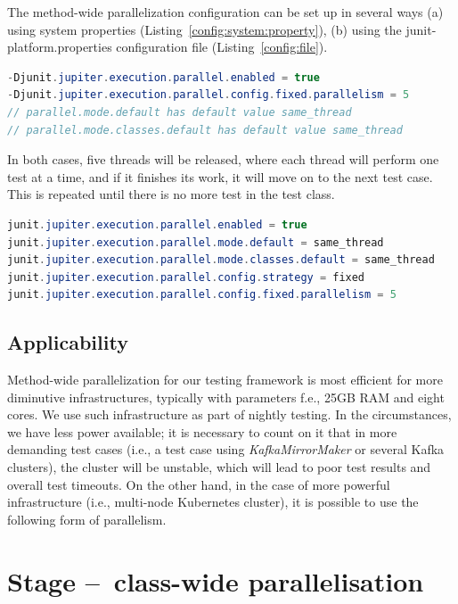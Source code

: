The method-wide parallelization configuration can be set up in several ways (a) using system properties (Listing~\ref{config:system:property}),
(b) using the junit-platform.properties configuration file (Listing~\ref{config:file}).
\begin{lstlisting}[language= Java,label=config:system:property,caption=(a) Configuration via system properties,frame=tb]
-Djunit.jupiter.execution.parallel.enabled = true
-Djunit.jupiter.execution.parallel.config.fixed.parallelism = 5
// parallel.mode.default has default value same_thread
// parallel.mode.classes.default has default value same_thread
\end{lstlisting}
In both cases, five threads will be released, where each thread will perform one test at a time, and if it finishes its work, it will move on to the next test case. This is repeated until there is no more test in the test class.
\begin{lstlisting}[language=Java,label=config:file,caption=(b) Configuration via file,frame = tb]
junit.jupiter.execution.parallel.enabled = true
junit.jupiter.execution.parallel.mode.default = same_thread
junit.jupiter.execution.parallel.mode.classes.default = same_thread
junit.jupiter.execution.parallel.config.strategy = fixed
junit.jupiter.execution.parallel.config.fixed.parallelism = 5
\end{lstlisting}

\subsection{Applicability}
\label{05:sub:sec:applicability}

Method-wide parallelization for our testing framework is most efficient for more diminutive infrastructures,
typically with parameters f.e., 25GB RAM and eight cores. We use such infrastructure as part of nightly testing.
In the circumstances, we have less power available; it is necessary to count on it that in more demanding test cases
(i.e., a test case using \emph{KafkaMirrorMaker} or several Kafka clusters), the cluster will be unstable, which will
lead to poor test results and overall test timeouts. On the other hand, in the case of more powerful infrastructure
(i.e., multi-node Kubernetes cluster), it is possible to use the following form of parallelism.

\section{Stage \---\ class-wide parallelisation}
\label{05:sec:class:wide:parallelism}

